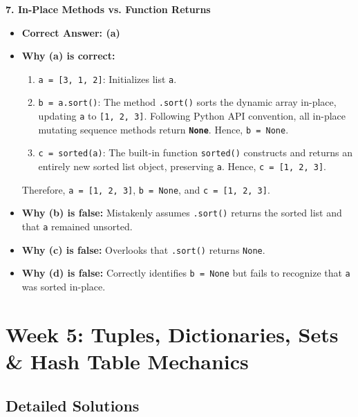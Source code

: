\textbf{7. In-Place Methods vs. Function Returns}
\begin{itemize}
    \item \textbf{Correct Answer: (a)}
    \item \textbf{Why (a) is correct:}
    \begin{enumerate}
        \item \texttt{a = [3, 1, 2]}: Initializes list \texttt{a}.
        \item \texttt{b = a.sort()}: The method \texttt{.sort()} sorts the dynamic array in-place, updating \texttt{a} to \texttt{[1, 2, 3]}. Following Python API convention, all in-place mutating sequence methods return \textbf{\texttt{None}}. Hence, \texttt{b = None}.
        \item \texttt{c = sorted(a)}: The built-in function \texttt{sorted()} constructs and returns an entirely new sorted list object, preserving \texttt{a}. Hence, \texttt{c = [1, 2, 3]}.
    \end{enumerate}
    Therefore, \texttt{a = [1, 2, 3]}, \texttt{b = None}, and \texttt{c = [1, 2, 3]}.
    \item \textbf{Why (b) is false:} Mistakenly assumes \texttt{.sort()} returns the sorted list and that \texttt{a} remained unsorted.
    \item \textbf{Why (c) is false:} Overlooks that \texttt{.sort()} returns \texttt{None}.
    \item \textbf{Why (d) is false:} Correctly identifies \texttt{b = None} but fails to recognize that \texttt{a} was sorted in-place.
\end{itemize}

\section*{Week 5: Tuples, Dictionaries, Sets \& Hash Table Mechanics}

\subsection*{Detailed Solutions}

